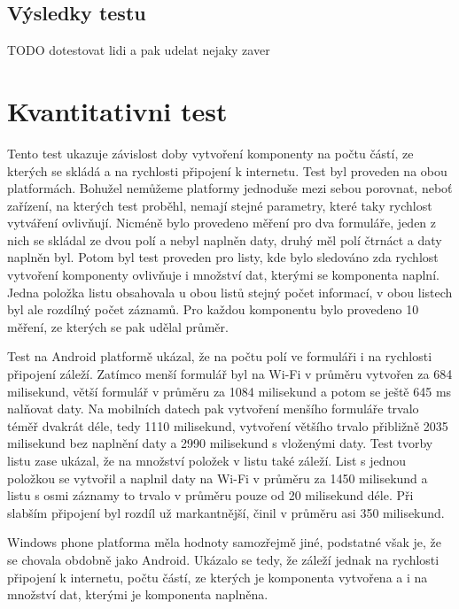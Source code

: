\subsection{Výsledky testu}
 TODO dotestovat lidi a pak udelat nejaky zaver

\section{Kvantitativni test} 
Tento test ukazuje závislost doby vytvoření komponenty na počtu částí, ze kterých se skládá a na rychlosti připojení k internetu. Test byl proveden na obou platformách. Bohužel nemůžeme platformy jednoduše mezi sebou porovnat, neboť zařízení, na kterých test proběhl, nemají stejné parametry, které taky rychlost vytváření ovlivňují. Nicméně bylo provedeno měření pro dva formuláře, jeden z nich se skládal ze dvou polí a nebyl naplněn daty, druhý měl polí čtrnáct a daty naplněn byl. Potom byl test proveden pro listy, kde bylo sledováno zda rychlost vytvoření komponenty ovlivňuje i množství dat, kterými se komponenta naplní. Jedna položka listu obsahovala u obou listů stejný počet informací, v obou listech byl ale rozdílný počet záznamů. Pro každou komponentu bylo provedeno 10 měření, ze kterých se pak udělal průměr. 

Test na Android platformě ukázal, že na počtu polí ve formuláři i na rychlosti připojení záleží. Zatímco menší formulář byl na Wi-Fi v průměru vytvořen za 684 milisekund, větší formulář v průměru za 1084 milisekund a potom se ještě 645 ms nalňovat daty. Na mobilních datech pak vytvoření menšího formuláře trvalo téměř dvakrát déle, tedy 1110 milisekund, vytvoření většího trvalo přibližně 2035 milisekund bez naplnění daty a 2990 milisekund s vloženými daty. Test tvorby listu zase ukázal, že na množství položek v listu také záleží. List s jednou položkou se vytvořil a naplnil daty na Wi-Fi v průměru za 1450 milisekund a listu s osmi záznamy to trvalo v průměru pouze od 20 milisekund déle. Při slabším připojení byl rozdíl už markantnější, činil v průměru asi 350 milisekund.

Windows phone platforma měla hodnoty samozřejmě jiné, podstatné však je, že se chovala obdobně jako Android. Ukázalo se tedy, že záleží jednak na rychlosti připojení k internetu, počtu částí, ze kterých je komponenta vytvořena a i na množství dat, kterými je komponenta naplněna.

